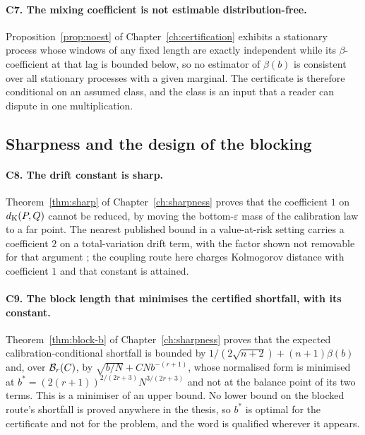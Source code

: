 \documentclass[../../../main.tex]{subfiles}
\begin{document}
\paragraph{C7. The mixing coefficient is not estimable distribution-free.} Proposition~\ref{prop:noest} of Chapter~\ref{ch:certification} exhibits a stationary process whose windows of any fixed length are exactly independent while its $\beta$-coefficient at that lag is bounded below, so no estimator of $\beta(b)$ is consistent over all stationary processes with a given marginal. The certificate is therefore conditional on an assumed class, and the class is an input that a reader can dispute in one multiplication.

\subsection{Sharpness and the design of the blocking}

\paragraph{C8. The drift constant is sharp.} Theorem~\ref{thm:sharp} of Chapter~\ref{ch:sharpness} proves that the coefficient $1$ on $d_{\mathrm{K}}(P,Q)$ cannot be reduced, by moving the bottom-$\varepsilon$ mass of the calibration law to a far point. The nearest published bound in a value-at-risk setting carries a coefficient $2$ on a total-variation drift term, with the factor shown not removable for that argument \citep[p.~3]{schmitt2026}; the coupling route here charges Kolmogorov distance with coefficient $1$ and that constant is attained.

\paragraph{C9. The block length that minimises the certified shortfall, with its constant.} Theorem~\ref{thm:block-b} of Chapter~\ref{ch:sharpness} proves that the expected calibration-conditional shortfall is bounded by $1/(2\sqrt{n+2})+(n+1)\beta(b)$ and, over $\mathcal B_{r}(C)$, by $\sqrt{b/N}+CNb^{-(r+1)}$, whose normalised form is minimised at $b^*=(2(r+1))^{2/(2r+3)}N^{3/(2r+3)}$ and not at the balance point of its two terms. This is a minimiser of an upper bound. No lower bound on the blocked route's shortfall is proved anywhere in the thesis, so $b^*$ is optimal for the certificate and not for the problem, and the word is qualified wherever it appears.
\end{document}

